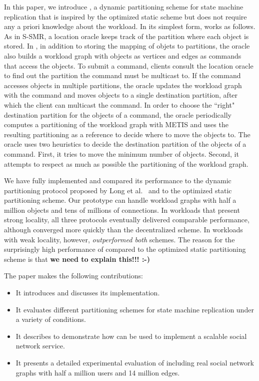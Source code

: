 In this paper, we introduce \dynastar, a dynamic partitioning scheme for state machine replication that is inspired by the optimized static scheme but does not require any a priori knowledge about the workload.
%
In its simplest form, \dynastar works as follows.
As in S-SMR, a location oracle keeps track of the partition where each object is stored.
In \dynastar, in addition to storing the mapping of objets to partitions, the oracle also builds a workload graph with objects as vertices and edges as commands that access the objects. 
To submit a command, clients consult the location oracle to find out the partition the command must be multicast to.
If the command accesses objects in multiple partitions, the oracle updates the workload graph with the command and moves objects to a single destination partition, after which the client can multicast the command.
In order to choose the ``right" destination partition for the objects of a command, the oracle periodically computes a partitioning of the workload graph with METIS and uses the resulting partitioning as a reference to decide where to move the objects to.
The oracle uses two heuristics to decide the destination partition of the objects of a command.
First, it tries to move the minimum number of objects.
Second, it attempts to respect as much as possible the partitioning of the workload graph.

We have fully implemented \dynastar and compared its performance to the dynamic partitioning protocol proposed by Long et al.~\cite{hoang2016} and to the optimized static partitioning scheme.
Our prototype can handle workload graphs with half a million objects and tens of millions of connections.
In workloads that present strong locality, all three protocols eventually delivered comparable performance, although \dynastar converged more quickly than the decentralized scheme.
In workloads with weak locality, however, \dynastar \emph{outperformed both} schemes.
The reason for the surprisingly high performance of \dynastar compared to the optimized static partitioning scheme is that \textbf{we need to explain this!!! :-)}

The paper makes the following contributions:
\begin{itemize}
\item It introduces \dynastar and discusses its implementation. 
\item It evaluates different partitioning schemes for state machine replication under a variety of conditions.
\item It describes \appname{} to demonstrate how \libname{} can be used to implement a scalable social network service.
\item It presents a detailed experimental evaluation of \dynastar including real social network graphs with half a million users and 14 million edges.
\end{itemize}

